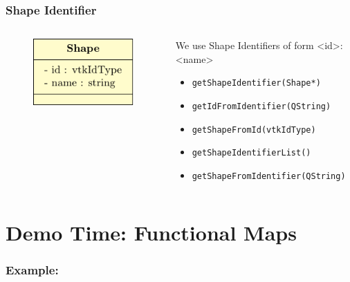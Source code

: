 \documentclass[compress]{beamer}
\begin{document}
\begin{frame}
	\frametitle{Shape Identifier}
	
	\begin{columns}
    		\begin{column}{.3\linewidth}
      		\begin{figure}[h]
				\centering
				\includegraphics[width=\textwidth]{diagramshape.pdf}
			\end{figure}
   		\end{column}
    		\begin{column}{.7\linewidth}
		
			 We use Shape Identifiers of form <id>:<name> 
			 
			 \begin{itemize}
			 	\item<2> \texttt{getShapeIdentifier(Shape*)}
				\item<2> \texttt{getIdFromIdentifier(QString)}
				\item<2> \texttt{getShapeFromId(vtkIdType)}
				\item<2> \texttt{getShapeIdentifierList()}
				\item<2> \texttt{getShapeFromIdentifier(QString)}
			 \end{itemize}
      
    		\end{column}
  	\end{columns}
	
\end{frame}

\section{Demo Time: Functional Maps}

\begin{frame}
  \frametitle{Example:}
  
\end{frame}
\end{document}
